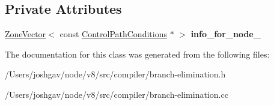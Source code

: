 \subsection*{Private Attributes}
\begin{DoxyCompactItemize}
\item 
\hyperlink{classv8_1_1internal_1_1_zone_vector}{Zone\+Vector}$<$ const \hyperlink{classv8_1_1internal_1_1compiler_1_1_branch_elimination_1_1_control_path_conditions}{Control\+Path\+Conditions} $\ast$ $>$ {\bfseries info\+\_\+for\+\_\+node\+\_\+}\hypertarget{classv8_1_1internal_1_1compiler_1_1_branch_elimination_1_1_path_conditions_for_control_nodes_a4f1a088a82c86ba57a25bd019a3d35f8}{}\label{classv8_1_1internal_1_1compiler_1_1_branch_elimination_1_1_path_conditions_for_control_nodes_a4f1a088a82c86ba57a25bd019a3d35f8}

\end{DoxyCompactItemize}


The documentation for this class was generated from the following files\+:\begin{DoxyCompactItemize}
\item 
/\+Users/joshgav/node/v8/src/compiler/branch-\/elimination.\+h\item 
/\+Users/joshgav/node/v8/src/compiler/branch-\/elimination.\+cc\end{DoxyCompactItemize}
